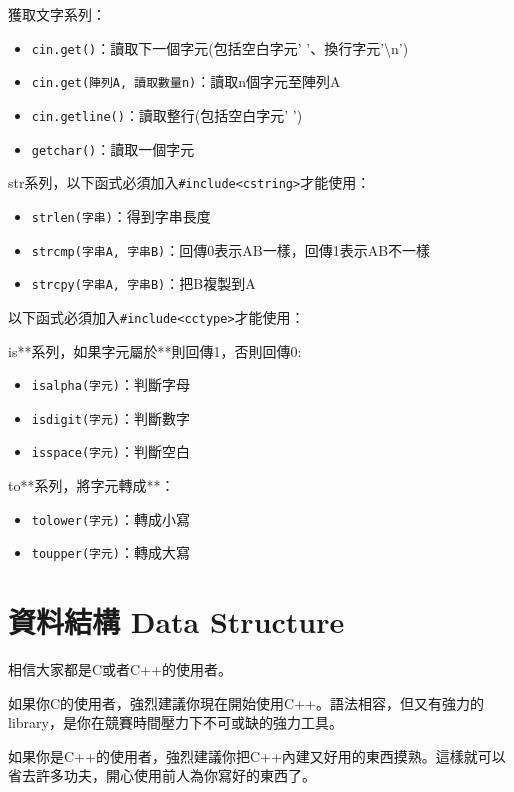 \documentclass[a4paper, 11pt, oneside]{book}
\begin{document}
獲取文字系列：
\begin{itemize}
    \item \texttt{cin.get()}：讀取下一個字元(包括空白字元' '、換行字元'\textbackslash{}n')
    \item \texttt{cin.get(陣列A, 讀取數量n)}：讀取n個字元至陣列A
    \item \texttt{cin.getline()}：讀取整行(包括空白字元' ')
    \item \texttt{getchar()}：讀取一個字元
\end{itemize}
str系列，以下函式必須加入\texttt{\#include<cstring>}才能使用：
\begin{itemize}
    \item \texttt{strlen(字串)}：得到字串長度
    \item \texttt{strcmp(字串A, 字串B)}：回傳0表示AB一樣，回傳1表示AB不一樣
    \item \texttt{strcpy(字串A, 字串B)}：把B複製到A
\end{itemize}
以下函式必須加入\texttt{\#include<cctype>}才能使用：

is**系列，如果字元屬於**則回傳1，否則回傳0:
\begin{itemize}
    \item \texttt{isalpha(字元)}：判斷字母
    \item \texttt{isdigit(字元)}：判斷數字
    \item \texttt{isspace(字元)}：判斷空白
\end{itemize}

to**系列，將字元轉成**：
\begin{itemize}
    \item \texttt{tolower(字元)}：轉成小寫
    \item \texttt{toupper(字元)}：轉成大寫
\end{itemize}

\chapter{資料結構 Data Structure}

相信大家都是C或者C++的使用者。

如果你C的使用者，強烈建議你現在開始使用C++。語法相容，但又有強力的library，是你在競賽時間壓力下不可或缺的強力工具。

如果你是C++的使用者，強烈建議你把C++內建又好用的東西摸熟。這樣就可以省去許多功夫，開心使用前人為你寫好的東西了。
\end{document}
